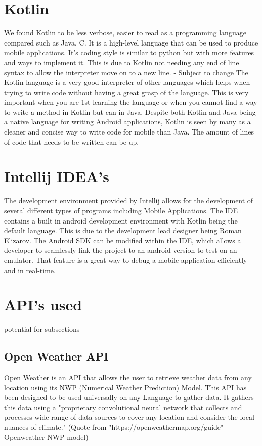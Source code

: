 \section{Kotlin}
We found Kotlin to be less verbose, easier to read as a programming language compared such as Java, C. It is a high-level language that can be used to produce mobile applications. It's coding style is similar to python but with more features and ways to implement it.  \newline \newline
This is due to Kotlin not needing any end of line syntax to allow the interpreter move on to a new line. - Subject to change
\newline \newline
The Kotlin language is a very good interpreter of other languages which helps when trying to write code without having a great grasp of the language. This is very important when you are 1st learning the language or when you cannot find a way to write a method in Kotlin but can in Java. 
\newline
Despite both Kotlin and Java being a native language for writing Android applications, Kotlin is seen by many as a cleaner and concise way to write code for mobile than Java. The amount of lines of code that needs to be written can be up. 

\section{Intellij IDEA's}
The development environment provided by Intellij allows for the development of several different types of programs including Mobile Applications. The IDE contains a built in android development environment with Kotlin being the default language. This is due to the development lead designer being Roman Elizarov.
\newline
The Android SDK can be modified within the IDE, which allows a developer to seamlessly link the project to an android version to test on an emulator. That feature is a great way to debug a mobile application efficiently and in real-time.
\section{API's used}
potential for subsections

\subsection{Open Weather API}
Open Weather is an API that allows the user to retrieve weather data from any location using its NWP (Numerical Weather Prediction) Model. This API has been designed to be used universally on any Language to gather data. It gathers this data using a "proprietary convolutional neural network that collects and processes wide range of data sources to cover any location and consider the local nuances of climate." (Quote from "https://openweathermap.org/guide" - Openweather NWP model)
